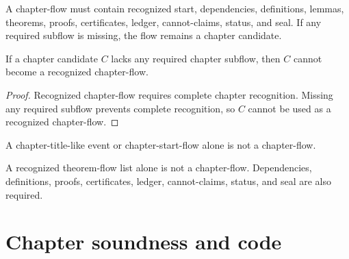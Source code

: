 \begin{principle}
\label{prin:chapter-manuscript-no-incomplete-chapter}
A chapter-flow must contain recognized start, dependencies, definitions, lemmas, theorems, proofs, certificates, ledger, cannot-claims, status, and seal. If any required subflow is missing, the flow remains a chapter candidate.
\end{principle}

\begin{theorem}
\label{thm:chapter-manuscript-incomplete-chapter-not-flow}
If a chapter candidate $C$ lacks any required chapter subflow, then $C$ cannot become a recognized chapter-flow.
\end{theorem}

\begin{proof}
Recognized chapter-flow requires complete chapter recognition. Missing any required subflow prevents complete recognition, so $C$ cannot be used as a recognized chapter-flow.
\end{proof}

\begin{corollary}
\label{cor:chapter-manuscript-title-alone-not-chapter}
A chapter-title-like event or chapter-start-flow alone is not a chapter-flow.
\end{corollary}

\begin{corollary}
\label{cor:chapter-manuscript-theorem-list-not-chapter}
A recognized theorem-flow list alone is not a chapter-flow. Dependencies, definitions, proofs, certificates, ledger, cannot-claims, status, and seal are also required.
\end{corollary}

\section{Chapter soundness and code}
\label{sec:chapter-manuscript-chapter-soundness-code}

